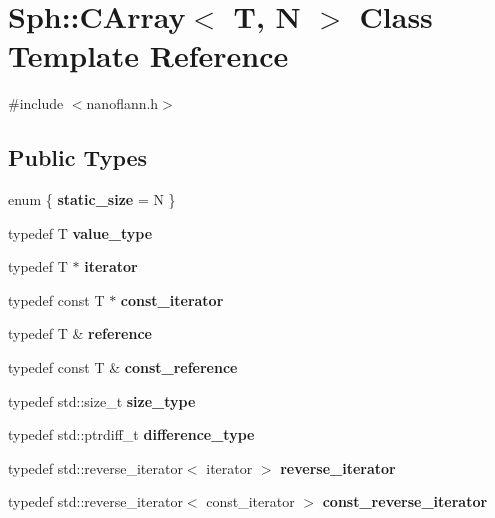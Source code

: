 \hypertarget{classSph_1_1CArray}{}\section{Sph\+:\+:C\+Array$<$ T, N $>$ Class Template Reference}
\label{classSph_1_1CArray}


{\ttfamily \#include $<$nanoflann.\+h$>$}

\subsection*{Public Types}
\begin{DoxyCompactItemize}
\item 
\hypertarget{classSph_1_1CArray_a7cd672d88f876ea0335c45b05596f94d}{}\label{classSph_1_1CArray_a7cd672d88f876ea0335c45b05596f94d} 
enum \{ {\bfseries static\+\_\+size} = N
 \}
\item 
\hypertarget{classSph_1_1CArray_ab5e5d57a00b35bef4acdbb65c2f58053}{}\label{classSph_1_1CArray_ab5e5d57a00b35bef4acdbb65c2f58053} 
typedef T {\bfseries value\+\_\+type}
\item 
\hypertarget{classSph_1_1CArray_a5ab5043e9807a80c3231a5095990afb9}{}\label{classSph_1_1CArray_a5ab5043e9807a80c3231a5095990afb9} 
typedef T $\ast$ {\bfseries iterator}
\item 
\hypertarget{classSph_1_1CArray_a605108f93a356bea2ad4d1b4965db468}{}\label{classSph_1_1CArray_a605108f93a356bea2ad4d1b4965db468} 
typedef const T $\ast$ {\bfseries const\+\_\+iterator}
\item 
\hypertarget{classSph_1_1CArray_aa9618701c693d2cfc93037f6845693d7}{}\label{classSph_1_1CArray_aa9618701c693d2cfc93037f6845693d7} 
typedef T \& {\bfseries reference}
\item 
\hypertarget{classSph_1_1CArray_ae2a21c36aa741ba6386da42ce2c97da9}{}\label{classSph_1_1CArray_ae2a21c36aa741ba6386da42ce2c97da9} 
typedef const T \& {\bfseries const\+\_\+reference}
\item 
\hypertarget{classSph_1_1CArray_ab46e7962656ad78df32565d71ca809b3}{}\label{classSph_1_1CArray_ab46e7962656ad78df32565d71ca809b3} 
typedef std\+::size\+\_\+t {\bfseries size\+\_\+type}
\item 
\hypertarget{classSph_1_1CArray_aa6d393f289c446e0be8bca1c4109cdd9}{}\label{classSph_1_1CArray_aa6d393f289c446e0be8bca1c4109cdd9} 
typedef std\+::ptrdiff\+\_\+t {\bfseries difference\+\_\+type}
\item 
\hypertarget{classSph_1_1CArray_a6d98ea796c993f005dab935891c4b168}{}\label{classSph_1_1CArray_a6d98ea796c993f005dab935891c4b168} 
typedef std\+::reverse\+\_\+iterator$<$ iterator $>$ {\bfseries reverse\+\_\+iterator}
\item 
\hypertarget{classSph_1_1CArray_af224ccc17a49817f54ab8a272d385aa1}{}\label{classSph_1_1CArray_af224ccc17a49817f54ab8a272d385aa1} 
typedef std\+::reverse\+\_\+iterator$<$ const\+\_\+iterator $>$ {\bfseries const\+\_\+reverse\+\_\+iterator}
\end{DoxyCompactItemize}
